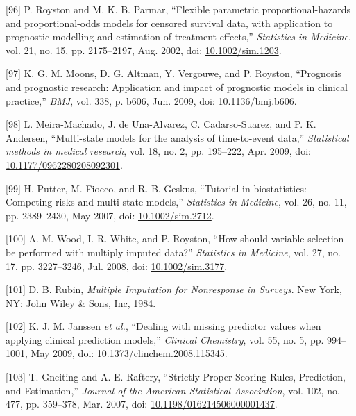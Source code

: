 \documentclass[12pt,PhD,twoside,openright]{muthesis}
\newenvironment{cslreferences}%
  {}%
  {\par}
\begin{document}
\begin{cslreferences}
\leavevmode\hypertarget{ref-royston_flexible_2002}{}%
{[}96{]} P. Royston and M. K. B. Parmar, ``Flexible parametric proportional-hazards and proportional-odds models for censored survival data, with application to prognostic modelling and estimation of treatment effects,'' \emph{Statistics in Medicine}, vol. 21, no. 15, pp. 2175--2197, Aug. 2002, doi: \href{https://doi.org/10.1002/sim.1203}{10.1002/sim.1203}.

\leavevmode\hypertarget{ref-moons_prognosis_2009-1}{}%
{[}97{]} K. G. M. Moons, D. G. Altman, Y. Vergouwe, and P. Royston, ``Prognosis and prognostic research: Application and impact of prognostic models in clinical practice,'' \emph{BMJ}, vol. 338, p. b606, Jun. 2009, doi: \href{https://doi.org/10.1136/bmj.b606}{10.1136/bmj.b606}.

\leavevmode\hypertarget{ref-meira-machado_multi-state_2009}{}%
{[}98{]} L. Meira-Machado, J. de Una-Alvarez, C. Cadarso-Suarez, and P. K. Andersen, ``Multi-state models for the analysis of time-to-event data,'' \emph{Statistical methods in medical research}, vol. 18, no. 2, pp. 195--222, Apr. 2009, doi: \href{https://doi.org/10.1177/0962280208092301}{10.1177/0962280208092301}.

\leavevmode\hypertarget{ref-putter_tutorial_2007}{}%
{[}99{]} H. Putter, M. Fiocco, and R. B. Geskus, ``Tutorial in biostatistics: Competing risks and multi-state models,'' \emph{Statistics in Medicine}, vol. 26, no. 11, pp. 2389--2430, May 2007, doi: \href{https://doi.org/10.1002/sim.2712}{10.1002/sim.2712}.

\leavevmode\hypertarget{ref-wood_how_2008}{}%
{[}100{]} A. M. Wood, I. R. White, and P. Royston, ``How should variable selection be performed with multiply imputed data?'' \emph{Statistics in Medicine}, vol. 27, no. 17, pp. 3227--3246, Jul. 2008, doi: \href{https://doi.org/10.1002/sim.3177}{10.1002/sim.3177}.

\leavevmode\hypertarget{ref-rubin_multiple_1984}{}%
{[}101{]} D. B. Rubin, \emph{Multiple Imputation for Nonresponse in Surveys}. New York, NY: John Wiley \& Sons, Inc, 1984.

\leavevmode\hypertarget{ref-janssen_dealing_2009}{}%
{[}102{]} K. J. M. Janssen \emph{et al.}, ``Dealing with missing predictor values when applying clinical prediction models,'' \emph{Clinical Chemistry}, vol. 55, no. 5, pp. 994--1001, May 2009, doi: \href{https://doi.org/10.1373/clinchem.2008.115345}{10.1373/clinchem.2008.115345}.

\leavevmode\hypertarget{ref-gneiting_strictly_2007}{}%
{[}103{]} T. Gneiting and A. E. Raftery, ``Strictly Proper Scoring Rules, Prediction, and Estimation,'' \emph{Journal of the American Statistical Association}, vol. 102, no. 477, pp. 359--378, Mar. 2007, doi: \href{https://doi.org/10.1198/016214506000001437}{10.1198/016214506000001437}.


\end{cslreferences}
\end{document}
